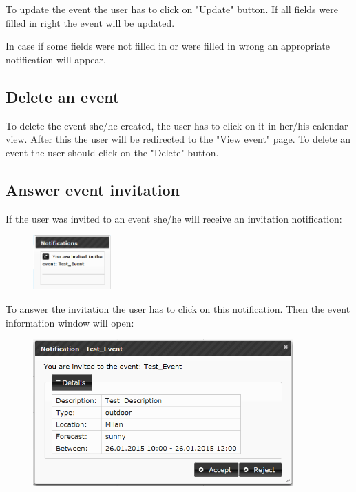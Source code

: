\par To update the event the user has to click on "Update" button. If all fields were filled in right the event will be updated.
\par In case if some fields were not filled in or were filled in wrong an appropriate notification will appear.

\subsection{Delete an event}
\par \qquad To delete the event she/he created, the user has to click on it in her/his calendar view. After this the user will be redirected to the "View event" page. To delete an event the user should click on the "Delete" button.

\newpage
\subsection{Answer event invitation}
\par \qquad If the user was invited to an event she/he will receive an invitation notification:
  \begin{figure}[tbh]
  \begin{center}
    \includegraphics[width=30mm]{invnot}
  \end{center}
\end{figure} 

\par To answer the invitation the user has to click on this notification. Then the event information window will open:
  \begin{figure}[tbh]
  \begin{center}
    \includegraphics[width=100mm]{invit}
  \end{center}
\end{figure}

